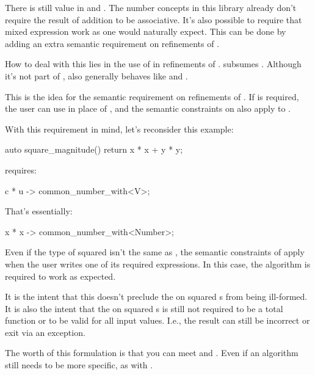 \pnum
There is still value in  and .
The number concepts in this library
already don't require the result of addition to be associative.
It's also possible to require that mixed expression work as one would naturally expect.
This can be done by adding an extra semantic requirement on refinements of .

\pnum
How to deal with this lies in the use of  in refinements of .
 subsumes .
Although it's not part of ,
 also generally behaves like  and .

\pnum
This is the idea for the semantic requirement on refinements of .
If  is required,
the user can use  in place of , and
the semantic constraints on  also apply to .

\pnum
With this requirement in mind, let's reconsider this example:
\begin{codeblock}
auto square_magnitude() { return x * x + y * y; }
\end{codeblock}
 requires:
\begin{codeblock}
{ c * u } -> common_number_with<V>;
\end{codeblock}
That's essentially:
\begin{codeblock}
{ x * x } -> common_number_with<Number>;
\end{codeblock}
Even if the type of  squared isn't the same as ,
the semantic constraints of  apply
when the user writes one of its required expressions.
In this case, the algorithm is required to work as expected.

\pnum
It is the intent that this doesn't preclude the \tcode{+} on squared s from being ill-formed.
It is also the intent that the \tcode{+} on squared s
is still not required to be a total function
or to be valid for all input values.
I.e., the result can still be incorrect or exit via an exception.

\pnum
The worth of this formulation is that you can meet  and .
Even if an algorithm still needs to be more specific, as with .

\pnum
\wheredevelisat
